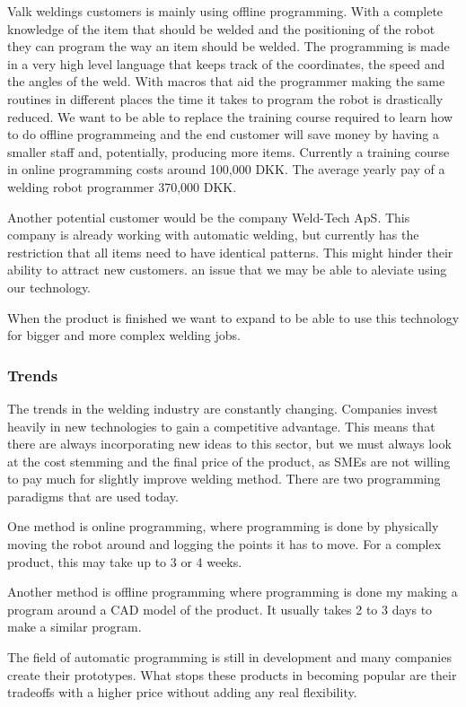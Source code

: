 Valk weldings customers is mainly using offline programming.
With a complete knowledge of the item that should be welded and the positioning of the robot they can program the way an item should be welded.
The programming is made in a very high level language that keeps track of the coordinates, the speed and the angles of the weld.
With macros that aid the programmer making the same routines in different places the time it takes to program the robot is drastically reduced.
We want to be able to replace the training course required to learn how to do offline programmeing and the end customer will save money by having a smaller staff and, potentially, producing more items. 
Currently a training course in online programming costs around 100,000 DKK\cite{valk_welding_summary}. 
The average yearly pay of a welding robot programmer 370,000 DKK\cite{welding_salary}. 

Another potential customer would be the company Weld-Tech ApS. 
This company is already working with automatic welding, but currently has the restriction that all items need to have identical patterns. 
This might hinder their ability to attract new customers. an issue that we may be able to aleviate using our technology.

When the product is finished we want to expand to be able to use this technology for bigger and more complex welding jobs.

\subsubsection{Trends}
The trends in the welding industry are constantly changing. 
Companies invest heavily in new technologies to gain a competitive advantage. 
This means that there are always incorporating new ideas to this sector, but we must always look at the cost stemming and the final price of the product, as SMEs are not willing to pay much for slightly improve welding method.
There are two programming paradigms that are used today.

One method is online programming, where programming is done by physically moving the robot around and logging the points it has to move. For a complex product, this may take up to 3 or 4 weeks.

Another method is offline programming where programming is done my making a program around a CAD model of the product.
It usually takes 2 to 3 days to make a similar program.

The field of automatic programming is still in development and many companies create their prototypes. 
What stops these products in becoming popular are their tradeoffs with a higher price without adding any real flexibility.
